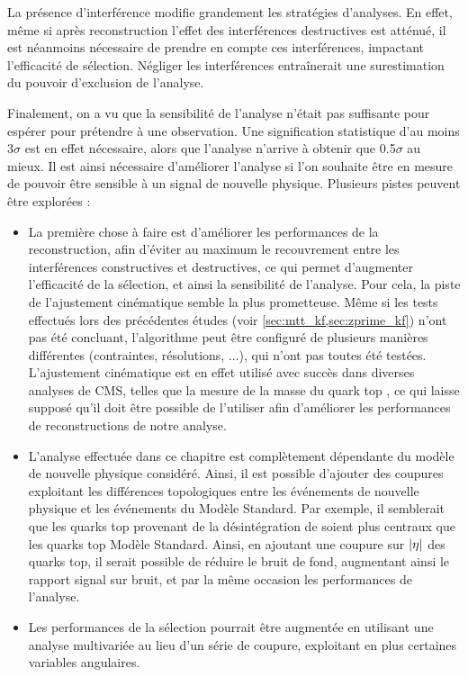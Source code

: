 \medskip

La présence d'interférence modifie grandement les stratégies d'analyses. En effet, même si après reconstruction l'effet des interférences destructives est atténué, il est néanmoins nécessaire de prendre en compte ces interférences, impactant l'efficacité de sélection. Négliger les interférences entraînerait une surestimation du pouvoir d'exclusion de l'analyse.

\bigskip

Finalement, on a vu que la sensibilité de l'analyse n'était pas suffisante pour espérer pour prétendre à une observation. Une signification statistique d'au moins $3\sigma$ est en effet nécessaire, alors que l'analyse n'arrive à obtenir que \num{0.5}$\sigma$ au mieux. Il est ainsi nécessaire d'améliorer l'analyse si l'on souhaite être en mesure de pouvoir être sensible à un signal de nouvelle physique. Plusieurs pistes peuvent être explorées :
\begin{itemize}
    \item La première chose à faire est d'améliorer les performances de la reconstruction, afin d'éviter au maximum le recouvrement entre les interférences constructives et destructives, ce qui permet d'augmenter l'efficacité de la sélection, et ainsi la sensibilité de l'analyse. Pour cela, la piste de l'ajustement cinématique semble la plus prometteuse. Même si les tests effectués lors des précédentes études (voir \cref{sec:mtt_kf,sec:zprime_kf}) n'ont pas été concluant, l'algorithme peut être configuré de plusieurs manières différentes (contraintes, résolutions, ...), qui n'ont pas toutes été testées. L'ajustement cinématique est en effet utilisé avec succès dans diverses analyses de CMS, telles que la mesure de la masse du quark top \citep{CMS-PAS-TOP-14-001}, ce qui laisse supposé qu'il doit être possible de l'utiliser afin d'améliorer les performances de reconstructions de notre analyse.

    \item L'analyse effectuée dans ce chapitre est complètement dépendante du modèle de nouvelle physique considéré. Ainsi, il est possible d'ajouter des coupures exploitant les différences topologiques entre les événements de nouvelle physique et les événements du Modèle Standard. Par exemple, il semblerait que les quarks top provenant de la désintégration de \sz soient plus centraux que les quarks top Modèle Standard. Ainsi, en ajoutant une coupure sur $\lvert \eta \rvert$ des quarks top, il serait possible de réduire le bruit de fond, augmentant ainsi le rapport signal sur bruit, et par la même occasion les performances de l'analyse.

    \item Les performances de la sélection pourrait être augmentée en utilisant une analyse multivariée au lieu d'un série de coupure, exploitant en plus certaines variables angulaires.
\end{itemize}

